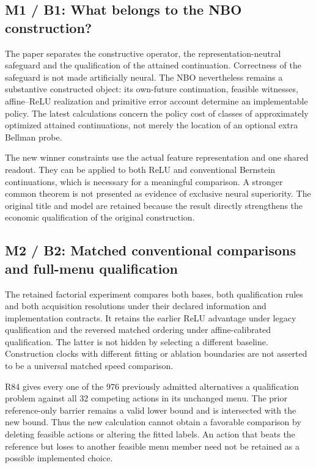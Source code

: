 \hypertarget{m1-b1-what-belongs-to-the-nbo-construction}{%
\subsection{M1 / B1: What belongs to the NBO
construction?}\label{m1-b1-what-belongs-to-the-nbo-construction}}

The paper separates the constructive operator, the
representation-neutral safeguard and the qualification of the attained
continuation. Correctness of the safeguard is not made artificially
neural. The NBO nevertheless remains a substantive constructed object:
its own-future continuation, feasible witnesses, affine--ReLU
realization and primitive error account determine an implementable
policy. The latest calculations concern the policy cost of classes of
approximately optimized attained continuations, not merely the location
of an optional extra Bellman probe.

The new winner constraints use the actual feature representation and one
shared readout. They can be applied to both ReLU and conventional
Bernstein continuations, which is necessary for a meaningful comparison.
A stronger common theorem is not presented as evidence of exclusive
neural superiority. The original title and model are retained because
the result directly strengthens the economic qualification of the
original construction.

\hypertarget{m2-b2-matched-conventional-comparisons-and-full-menu-qualification}{%
\subsection{M2 / B2: Matched conventional comparisons and full-menu
qualification}\label{m2-b2-matched-conventional-comparisons-and-full-menu-qualification}}

The retained factorial experiment compares both bases, both
qualification rules and both acquisition resolutions under their
declared information and implementation contracts. It retains the
earlier ReLU advantage under legacy qualification and the reversed
matched ordering under affine-calibrated qualification. The latter is
not hidden by selecting a different baseline. Construction clocks with
different fitting or ablation boundaries are not asserted to be a
universal matched speed comparison.

R84 gives every one of the 976 previously admitted alternatives a
qualification problem against all 32 competing actions in its unchanged
menu. The prior reference-only barrier remains a valid lower bound and
is intersected with the new bound. Thus the new calculation cannot
obtain a favorable comparison by deleting feasible actions or altering
the fitted labels. An action that beats the reference but loses to
another feasible menu member need not be retained as a possible
implemented choice.

